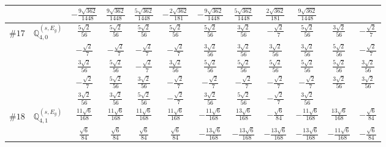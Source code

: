 \documentclass[fleqn,9pt,landscape]{jsarticle}
\begin{document}
\begin{center}
\begin{longtable}{lcccccccccc}
& $ - \frac{9 \sqrt{362}}{1448} $ & $ \frac{9 \sqrt{362}}{1448} $ & $ \frac{5 \sqrt{362}}{1448} $ & $ - \frac{2 \sqrt{362}}{181} $ & $ - \frac{9 \sqrt{362}}{1448} $ & $ \frac{5 \sqrt{362}}{1448} $ & $ \frac{2 \sqrt{362}}{181} $ & $ \frac{9 \sqrt{362}}{1448} $ & $  $ & $  $ \\ \hline
$ \#17\quad \mathbb{Q}_{4,0}^{(s,E_{g})} $ & $ \frac{5 \sqrt{2}}{56} $ & $ \frac{5 \sqrt{2}}{56} $ & $ \frac{5 \sqrt{2}}{56} $ & $ \frac{5 \sqrt{2}}{56} $ & $ \frac{5 \sqrt{2}}{56} $ & $ \frac{3 \sqrt{2}}{56} $ & $ - \frac{\sqrt{2}}{7} $ & $ \frac{5 \sqrt{2}}{56} $ & $ \frac{3 \sqrt{2}}{56} $ & $ - \frac{\sqrt{2}}{7} $ \\
& $ - \frac{\sqrt{2}}{7} $ & $ - \frac{\sqrt{2}}{7} $ & $ - \frac{\sqrt{2}}{7} $ & $ - \frac{\sqrt{2}}{7} $ & $ \frac{3 \sqrt{2}}{56} $ & $ \frac{3 \sqrt{2}}{56} $ & $ \frac{3 \sqrt{2}}{56} $ & $ \frac{3 \sqrt{2}}{56} $ & $ \frac{5 \sqrt{2}}{56} $ & $ - \frac{\sqrt{2}}{7} $ \\
& $ \frac{3 \sqrt{2}}{56} $ & $ \frac{5 \sqrt{2}}{56} $ & $ - \frac{\sqrt{2}}{7} $ & $ \frac{3 \sqrt{2}}{56} $ & $ \frac{5 \sqrt{2}}{56} $ & $ \frac{5 \sqrt{2}}{56} $ & $ \frac{5 \sqrt{2}}{56} $ & $ \frac{5 \sqrt{2}}{56} $ & $ \frac{5 \sqrt{2}}{56} $ & $ \frac{3 \sqrt{2}}{56} $ \\
& $ - \frac{\sqrt{2}}{7} $ & $ \frac{5 \sqrt{2}}{56} $ & $ \frac{3 \sqrt{2}}{56} $ & $ - \frac{\sqrt{2}}{7} $ & $ - \frac{\sqrt{2}}{7} $ & $ - \frac{\sqrt{2}}{7} $ & $ - \frac{\sqrt{2}}{7} $ & $ - \frac{\sqrt{2}}{7} $ & $ \frac{3 \sqrt{2}}{56} $ & $ \frac{3 \sqrt{2}}{56} $ \\
& $ \frac{3 \sqrt{2}}{56} $ & $ \frac{3 \sqrt{2}}{56} $ & $ \frac{5 \sqrt{2}}{56} $ & $ - \frac{\sqrt{2}}{7} $ & $ \frac{3 \sqrt{2}}{56} $ & $ \frac{5 \sqrt{2}}{56} $ & $ - \frac{\sqrt{2}}{7} $ & $ \frac{3 \sqrt{2}}{56} $ & $  $ & $  $ \\ \hline
$ \#18\quad \mathbb{Q}_{4,1}^{(s,E_{g})} $ & $ \frac{11 \sqrt{6}}{168} $ & $ \frac{11 \sqrt{6}}{168} $ & $ \frac{11 \sqrt{6}}{168} $ & $ \frac{11 \sqrt{6}}{168} $ & $ - \frac{11 \sqrt{6}}{168} $ & $ \frac{13 \sqrt{6}}{168} $ & $ - \frac{\sqrt{6}}{84} $ & $ - \frac{11 \sqrt{6}}{168} $ & $ \frac{13 \sqrt{6}}{168} $ & $ - \frac{\sqrt{6}}{84} $ \\
& $ \frac{\sqrt{6}}{84} $ & $ \frac{\sqrt{6}}{84} $ & $ \frac{\sqrt{6}}{84} $ & $ \frac{\sqrt{6}}{84} $ & $ - \frac{13 \sqrt{6}}{168} $ & $ - \frac{13 \sqrt{6}}{168} $ & $ - \frac{13 \sqrt{6}}{168} $ & $ - \frac{13 \sqrt{6}}{168} $ & $ - \frac{11 \sqrt{6}}{168} $ & $ - \frac{\sqrt{6}}{84} $ \\

\end{longtable}
\end{center}
\end{document}
